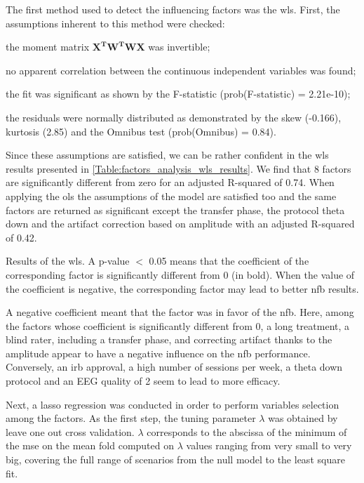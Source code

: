 The first method used to detect the influencing factors was the \gls{wls}. First, the assumptions inherent to this method were checked: 
\begin{description}
	\item the moment matrix $\mathbf{{X}^{T}W^{T}WX}$ was invertible;
  \item no apparent correlation between the continuous independent variables was found; 
  \item the fit was significant as shown by the F-statistic (prob(F-statistic) = 2.21e-10); 
  \item the residuals were normally distributed as demonstrated by the skew (-0.166), kurtosis (2.85) and the Omnibus test (prob(Omnibus) = 0.84).
\end{description}

Since these assumptions are satisfied, we can be rather confident in the \gls{wls} results presented in \cref{Table:factors_analysis_wls_results}. 
We find that 8 factors are significantly different from zero for an adjusted R-squared of 0.74. When applying the \gls{ols} the assumptions of the 
model are satisfied too and the same factors are returned as significant except the transfer phase, 
the protocol theta down and the artifact correction based on amplitude with an adjusted R-squared of 0.42. 

\begin{table}[h!]
  \centering
  \caption{Results of the \gls{wls}. A p-value $<$ 0.05 means that the coefficient of the corresponding factor is significantly different from $0$ (in bold). 
	When the value of the coefficient is negative, the corresponding factor may lead to better \gls{nfb} results.}
  
  \label{Table:factors_analysis_wls_results}
\end{table}

A negative coefficient meant that the factor was in favor of the \gls{nfb}. Here, among the factors whose coefficient is significantly 
different from 0, a long treatment, a blind rater, including a transfer phase, and correcting artifact thanks to the amplitude appear 
to have a negative influence on the \gls{nfb} performance. Conversely, an \gls{irb} approval, a high number of sessions per week, a theta
down protocol and an EEG quality of 2 seem to lead to more efficacy. 

Next, a \gls{lasso} regression was conducted in order to perform variables selection among the factors. As the first step, the tuning 
parameter $\lambda$ was obtained by leave one out cross validation. 
$\lambda$ corresponds to the abscissa of the minimum of the \gls{mse} on the mean fold computed on $\lambda$ values ranging from very 
small to very big, covering the full range of scenarios from the null model to the least square fit.

